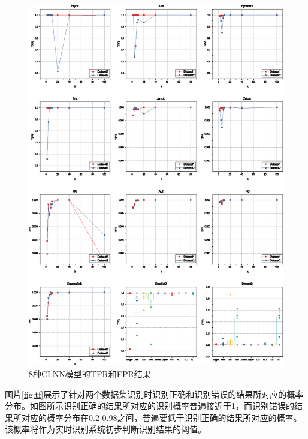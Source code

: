 \begin{figure}[htp]
\begin{center}
\includegraphics[width=1\textwidth]{figures/fprtpr.eps}
\caption{8种CLNN模型的TPR和FPR结果}\label{fig:fprtpr}
\end{center}
\end{figure}

图片\ref{fig:tf}展示了针对两个数据集识别时识别正确和识别错误的结果所对应的概率分布。如图所示识别正确的结果所对应的识别概率普遍接近于1，而识别错误的结果所对应的概率分布在0.2-0.98之间，普遍要低于识别正确的结果所对应的概率。该概率将作为实时识别系统初步判断识别结果的阈值。

